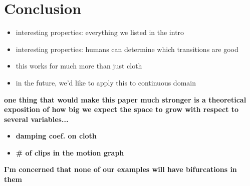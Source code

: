 \section{Conclusion}

\begin{itemize}
\item interesting properties: everything we listed in the intro
\item interesting properties: humans can determine which transitions are good
\item this works for much more than just cloth
\item in the future, we'd like to apply this to continuous domain
\end{itemize}
  
\textbf{one thing that would make this paper much stronger is a
  theoretical exposition of how big we expect the space to grow with
  respect to several variables...}
\begin{itemize}
\item \textbf{damping coef. on cloth }
\item \textbf{\# of clips in the motion graph}
\end{itemize}
\textbf{I'm concerned that none of our examples will have bifurcations in them}

